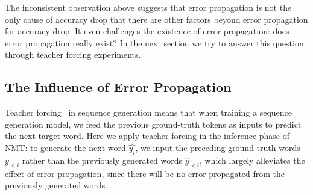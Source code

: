 \documentclass[11pt,a4paper]{article}
\begin{document}
The inconsistent observation above suggests that error propagation is not the only cause of accuracy drop that there are other factors beyond error propagation for accuracy drop. It even challenges the existence of error propagation: does error propagation really exist? In the next section we try to answer this question through teacher forcing experiments.


\subsection{The Influence of Error Propagation}
\label{teacher_forced}

Teacher forcing~\cite{DBLP:journals/neco/WilliamsZ89} in sequence generation means that when training a sequence generation model, we feed the previous ground-truth tokens as inputs to predict the next target word. Here we apply teacher forcing in the inference phase of NMT: to generate the next word $\hat{y_i}$, we input the preceding ground-truth words $y_{<i}$ rather than the previously generated words $\hat{y}_{<i}$, which largely alleviates the effect of error propagation, since there will be no error propagated from the previously generated words.





\end{document}
